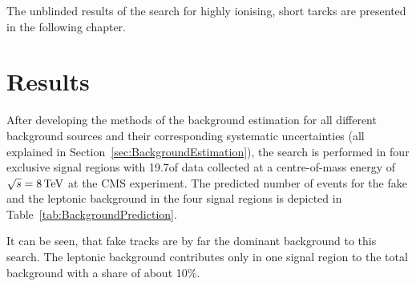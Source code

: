 The unblinded results of the search for highly ionising, short tarcks are presented in the following chapter.
\FloatBarrier
\chapter{Results}
\label{sec:Results}

After developing the methods of the background estimation for all different background sources and their corresponding systematic uncertainties (all explained in Section~\ref{sec:BackgroundEstimation}), 
the search is performed in four exclusive signal regions with 19.7\fbinv of data collected at a centre-of-mass energy of $\sqrt{s} = 8\,\text{Te}\kern-0.06667em\text{V}$ at the CMS experiment.
The predicted number of events for the fake and the leptonic background in the four signal regions is depicted in Table~\ref{tab:BackgroundPrediction}.
\renewcommand{\arraystretch}{1.5}
\begin{table}[!h]
\centering
\caption{Background prediction in the four exclusive signal regions for the fake and the leptonic background.}
\label{tab:BackgroundPrediction}
\end{table}
It can be seen, that fake tracks are by far the dominant background to this search.
The leptonic background contributes only in one signal region to the total background with a share of about 10\%.

